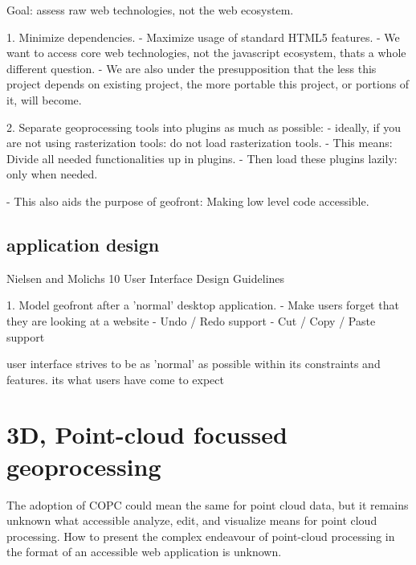 Goal: assess raw web technologies, not the web ecosystem. 

1. Minimize dependencies. 
  - Maximize usage of standard HTML5 features.
  - We want to access core web technologies, not the javascript ecosystem, thats a whole different question. 
  - We are also under the presupposition that the less this project depends on existing project, the more portable this project, or portions of it, will become.

2. Separate geoprocessing tools into plugins as much as possible: 
  - ideally, if you are not using rasterization tools: do not load rasterization tools. 
  - This means: Divide all needed functionalities up in plugins.
     - Then load these plugins lazily: only when needed.

  - This also aids the purpose of geofront: Making low level code accessible.

\subsection{application design}

Nielsen and Molichs 10 User Interface Design Guidelines

1. Model geofront after a 'normal' desktop application.  
  - Make users forget that they are looking at a website
  - Undo / Redo support
  - Cut / Copy / Paste support

  user interface strives to be as 'normal' as possible within its constraints and features. its what users have come to expect



\section{3D, Point-cloud focussed geoprocessing}

The adoption of COPC could mean the same for point cloud data, but it remains unknown what accessible analyze, edit, and visualize means for point cloud processing. 
How to present the complex endeavour of point-cloud processing in the format of an accessible web application is unknown. 






